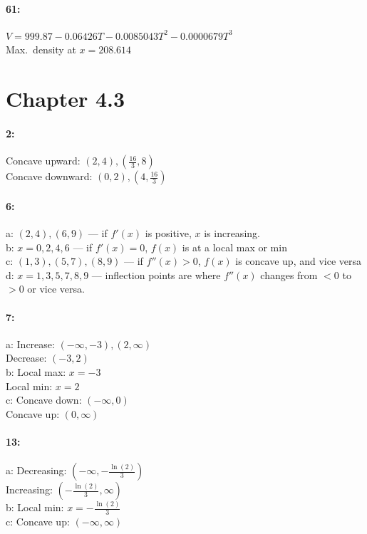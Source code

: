 \documentclass[12pt]{article}
\begin{document}
    \paragraph*{61:\\}
        $V = 999.87 - 0.06426T - 0.0085043T^2 - 0.0000679T^3$\\
        Max.\ density at $x = 208.614$
    
    \section*{Chapter 4.3}
    \paragraph*{2:\\}
            Concave upward:   $(2, 4), (\frac{16}{3}, 8)$\\
            Concave downward: $(0, 2), (4, \frac{16}{3})$\\

    \paragraph*{6:\\}
        a: $(2, 4), (6, 9)$ --- if $f'(x)$ is positive, $x$ is increasing. \\
        b: $x = {0, 2, 4, 6}$ --- if $f'(x) = 0$, $f(x)$ is at a local max or min\\
        c: $(1, 3), (5, 7), (8, 9)$ --- if $f''(x) > 0$, $f(x)$ is concave up, and vice versa\\
        d: $x = {1, 3, 5, 7, 8, 9}$ --- inflection points are where $f''(x)$ changes from $<0$ to $>0$ or vice versa.\\
    
    \paragraph*{7:\\}
            a: Increase: $(-\infty, -3), (2, \infty)$\\
               Decrease: $(-3, 2)$\\
            b: Local max: $x = -3$\\Local min: $x = 2$ \\
            c: Concave down: $(-\infty, 0)$\\ Concave up: $(0, \infty)$\\
    
    \paragraph*{13:\\}
            a: Decreasing: $(-\infty, -\frac{\ln(2)}{3})$\\Increasing: $(-\frac{\ln(2)}{3}, \infty)$\\
            b: Local min: $x = -\frac{\ln(2)}{3}$\\
            c: Concave up: $(-\infty, \infty)$\\
\end{document}
